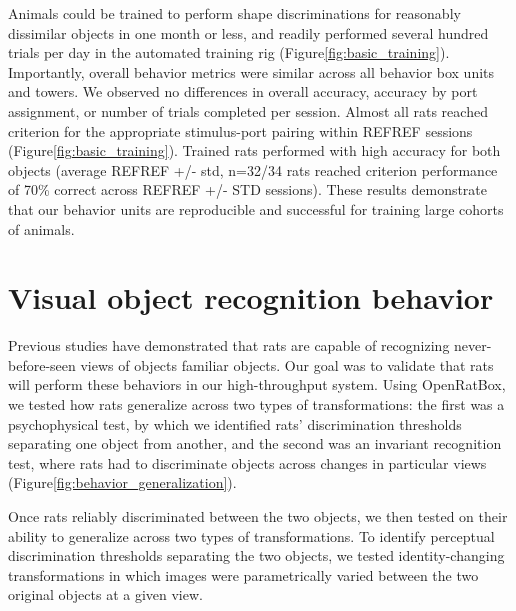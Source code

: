 Animals could be trained to perform shape discriminations for reasonably dissimilar objects in one month or less, and readily performed several hundred trials per day in the automated training rig (Figure\ref{fig:basic_training}). Importantly, overall behavior metrics were similar across all behavior box units and towers. We observed no differences in overall accuracy, accuracy by port assignment, or number of trials completed per session. Almost all rats reached criterion for the appropriate stimulus-port pairing within REFREF sessions (Figure\ref{fig:basic_training}). Trained rats performed with high accuracy for both objects (average REFREF +/- std, n=32/34 rats reached criterion performance of 70\% correct across REFREF +/- STD sessions). These results demonstrate that our behavior units are reproducible and successful for training large cohorts of animals. 

\section{Visual object recognition behavior}
Previous studies have demonstrated that rats are capable of recognizing never-before-seen views of objects familiar objects\cite{Zoccolan2009, Vermaercke2012, Tafazoli2012Transformation-TolerantPriming, REFREF}. Our goal was to validate that rats will perform these behaviors in our high-throughput system. Using OpenRatBox, we tested how rats generalize across two types of transformations: the first was a psychophysical test, by which we identified rats’ discrimination thresholds separating one object from another, and the second was an invariant recognition test, where rats had to discriminate objects across changes in particular views (Figure\ref{fig:behavior_generalization}). 

Once rats reliably discriminated between the two objects, we then tested on their ability to generalize across two types of transformations. To identify perceptual discrimination thresholds separating the two objects, we tested identity-changing transformations in which images were parametrically varied between the two original objects at a given view.

